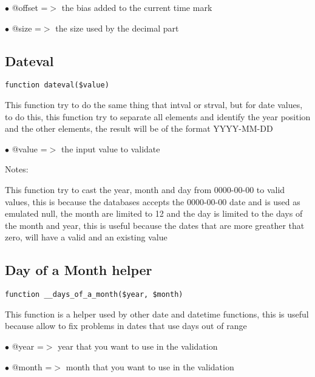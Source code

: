 \documentclass[a4paper]{book}
\begin{document}
\begin{compactitem}
\item[\color{myblue}$\bullet$] @offset =$>$ the bias added to the current time mark
\item[\color{myblue}$\bullet$] @size   =$>$ the size used by the decimal part
\end{compactitem}

\hypertarget{toc78}{}
\subsection{Dateval}

\begin{lstlisting}
function dateval($value)
\end{lstlisting}

This function try to do the same thing that intval or strval, but for date
values, to do this, this function try to separate all elements and identify
the year position and the other elements, the result will be of the format
YYYY-MM-DD

\begin{compactitem}
\item[\color{myblue}$\bullet$] @value =$>$ the input value to validate
\end{compactitem}

Notes:

This function try to cast the year, month and day from 0000-00-00 to valid
values, this is because the databases accepts the 0000-00-00 date and is used
as emulated null, the month are limited to 12 and the day is limited to the
days of the month and year, this is useful because the dates that are more
greather that zero, will have a valid and an existing value

\hypertarget{toc79}{}
\subsection{Day of a Month helper}

\begin{lstlisting}
function __days_of_a_month($year, $month)
\end{lstlisting}

This function is a helper used by other date and datetime functions, this
is useful because allow to fix problems in dates that use days out of range

\begin{compactitem}
\item[\color{myblue}$\bullet$] @year  =$>$ year that you want to use in the validation
\item[\color{myblue}$\bullet$] @month =$>$ month that you want to use in the validation
\end{compactitem}
\end{document}
